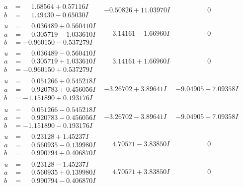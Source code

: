 \documentclass[1p]{elsarticle_modified}
\theoremstyle{definition}
\begin{document}
$$\begin{array}{c|c|c}
\begin{aligned}
a &= \phantom{-}1.68564 + 0.57116 I \\
b &= \phantom{-}1.49430 - 0.65030 I\end{aligned}
 & -0.50826 + 11.03970 I & \phantom{-0.000000 } 0 \\ \hline\begin{aligned}
u &= \phantom{-}0.036489 + 0.560410 I \\
a &= \phantom{-}0.305719 - 1.033610 I \\
b &= -0.960150 - 0.537279 I\end{aligned}
 & \phantom{-}3.14161 - 1.66960 I & \phantom{-0.000000 } 0 \\ \hline\begin{aligned}
u &= \phantom{-}0.036489 - 0.560410 I \\
a &= \phantom{-}0.305719 + 1.033610 I \\
b &= -0.960150 + 0.537279 I\end{aligned}
 & \phantom{-}3.14161 + 1.66960 I & \phantom{-0.000000 } 0 \\ \hline\begin{aligned}
u &= \phantom{-}0.051266 + 0.545218 I \\
a &= \phantom{-}0.920783 + 0.456056 I \\
b &= -1.151890 + 0.193176 I\end{aligned}
 & -3.26702 + 3.89641 I & -9.04905 - 7.09358 I \\ \hline\begin{aligned}
u &= \phantom{-}0.051266 - 0.545218 I \\
a &= \phantom{-}0.920783 - 0.456056 I \\
b &= -1.151890 - 0.193176 I\end{aligned}
 & -3.26702 - 3.89641 I & -9.04905 + 7.09358 I \\ \hline\begin{aligned}
u &= \phantom{-}0.23128 + 1.45237 I \\
a &= \phantom{-}0.560935 - 0.139980 I \\
b &= \phantom{-}0.990794 + 0.406870 I\end{aligned}
 & \phantom{-}4.70571 - 3.83850 I & \phantom{-0.000000 } 0 \\ \hline\begin{aligned}
u &= \phantom{-}0.23128 - 1.45237 I \\
a &= \phantom{-}0.560935 + 0.139980 I \\
b &= \phantom{-}0.990794 - 0.406870 I\end{aligned}
 & \phantom{-}4.70571 + 3.83850 I & \phantom{-0.000000 } 0\\

\end{array}$$
\end{document}

